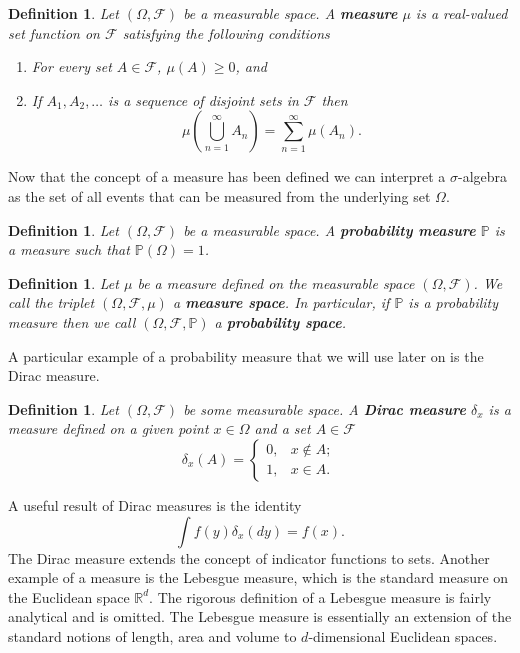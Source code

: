 \documentclass[honours,12pt]{UNSWthesis}
\newcommand{\R}{\mathbb{R}}
\newcommand{\PP}{\mathbb{P}}
\newcommand{\1}{\mathbf 1}
\newcommand{\FF}{\mathcal{F}}
\newtheorem{definition}[theorem]{Definition}
\numberwithin{equation}{section}
\theoremstyle{definition}
\theoremstyle{remark}
\begin{document}
\begin{definition}
Let $(\Omega,\FF)$ be a measurable space. A \textbf{measure} $\mu$ is a real-valued set function on $\FF$ satisfying the following conditions
\begin{enumerate}
\item For every set $A\in \FF$, $\mu(A) \geq 0$, and
\item If $A_1, A_2,\ldots$ is a sequence of disjoint sets in $\FF$ then 
\[
\mu\left(\bigcup_{n=1}^\infty A_n\right) = \sum_{n=1}^\infty \mu(A_n).
\]
\end{enumerate}
\end{definition}
\noindent Now that the concept of a measure has been defined we can interpret a $\sigma$-algebra as the set of all events that can be measured from the underlying set $\Omega$.\\
\begin{definition}
Let $(\Omega,\FF)$ be a measurable space. A \textbf{probability measure} $\PP$ is a measure such that $\PP(\Omega) = 1$.\\
\end{definition}
\begin{definition}
Let $\mu$ be a measure defined on the measurable space $(\Omega,\FF)$. We call the triplet $(\Omega,\FF,\mu)$ a \textbf{measure space}. In particular, if $\PP$ is a probability measure then we call $(\Omega,\FF,\PP)$ a \textbf{probability space}.\\
\end{definition}

{\noindent}A particular example of a probability measure that we will use later on is the Dirac measure.\\
\begin{definition} Let $(\Omega, \FF)$ be some measurable space. A \textbf{Dirac measure} $\delta_x$ is a measure defined on a given point $x\in \Omega$ and a set $A\in \FF$ 
\[
\delta_x(A) = 
\begin{cases}
0, &x\notin A;\\
1, &x\in A.
\end{cases}
\]
\end{definition}
{\noindent}A useful result of Dirac measures is the identity
\[
\int f(y)\delta_x(dy) = f(x).
\]
The Dirac measure extends the concept of indicator functions to sets. Another example of a measure is the Lebesgue measure, which is the standard measure on the Euclidean space $\R^d$. The rigorous definition of a Lebesgue measure is fairly analytical and is omitted. The Lebesgue measure is essentially an extension of the standard notions of length, area and volume to $d$-dimensional Euclidean spaces.\\
\end{document}
